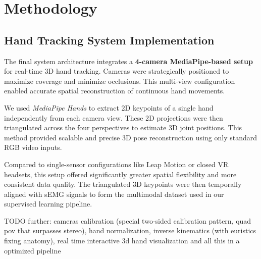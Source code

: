 \chapter{Methodology}
\label{chap:met}

\section{Hand Tracking System Implementation}

The final system architecture integrates a \textbf{4-camera MediaPipe-based setup} for real-time 3D hand tracking. Cameras were strategically positioned to maximize coverage and minimize occlusions. This multi-view configuration enabled accurate spatial reconstruction of continuous hand movements.

We used \textit{MediaPipe Hands} to extract 2D keypoints of a single hand independently from each camera view. These 2D projections were then triangulated across the four perspectives to estimate 3D joint positions. This method provided scalable and precise 3D pose reconstruction using only standard RGB video inputs.

Compared to single-sensor configurations like Leap Motion or closed VR headsets, this setup offered significantly greater spatial flexibility and more consistent data quality. The triangulated 3D keypoints were then temporally aligned with sEMG signals to form the multimodal dataset used in our supervised learning pipeline.

TODO
further: cameras calibration (special two-sided calibration pattern, quad pov that surpasses stereo), hand normalization, inverse kinematics (with euristics fixing anatomy), real time interactive 3d hand visualization and all this in a optimized pipeline

